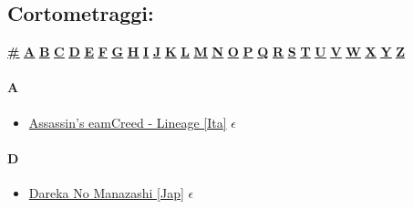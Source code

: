 
\subsection[Cortometraggi]{\huge Cortometraggi:}
	 \begin{center}
	 	\hyperlink{CA\#}{\textbf{\underline{\#}}}
	 	\hyperlink{CA}{\textbf{\underline{A}}} \hyperlink{CB}{\textbf{\underline{B}}} \hyperlink{CC}{\textbf{\underline{C}}} \hyperlink{CD}{\textbf{\underline{D}}} \hyperlink{CE}{\textbf{\underline{E}}} \hyperlink{CF}{\textbf{\underline{F}}} \hyperlink{CG}{\textbf{\underline{G}}} \hyperlink{CH}{\textbf{\underline{H}}} \hyperlink{CI}{\textbf{\underline{I}}} \hyperlink{CJ}{\textbf{\underline{J}}} \hyperlink{CK}{\textbf{\underline{K}}} \hyperlink{CL}{\textbf{\underline{L}}} \hyperlink{CM}{\textbf{\underline{M}}} \hyperlink{CN}{\textbf{\underline{N}}} \hyperlink{CO}{\textbf{\underline{O}}} \hyperlink{CP}{\textbf{\underline{P}}} \hyperlink{CQ}{\textbf{\underline{Q}}} \hyperlink{CR}{\textbf{\underline{R}}} \hyperlink{CS}{\textbf{\underline{S}}} \hyperlink{CT}{\textbf{\underline{T}}} \hyperlink{CU}{\textbf{\underline{U}}} \hyperlink{CV}{\textbf{\underline{V}}} \hyperlink{CW}{\textbf{\underline{W}}} \hyperlink{CX}{\textbf{\underline{X}}} \hyperlink{CY}{\textbf{\underline{Y}}} \hyperlink{CZ}{\textbf{\underline{Z}}}
	 \end{center}
	
		\paragraph{A} \hypertarget{CA}{}
			\begin{itemize}
				\item \href{https://mega.nz/#!YtQW2J5K!gp-Q1bxCIhxTseNUD4pCav9fqBT5W2lTaQjqkYlqtco} {Assassin's eamCreed - Lineage [Ita]} $\epsilon$ \\ 
		
			\end{itemize}
			
		\paragraph{D} \hypertarget{CD}{}
			\begin{itemize}
				\item \href{https://mega.nz/#!dw4m2CBa!L9egondmp6jgMQV8_gVMfBea15wBzXbQb4FRQ7r9kNM} {Dareka No Manazashi [Jap]} $\epsilon$ \\ 
		
			\end{itemize}
		
